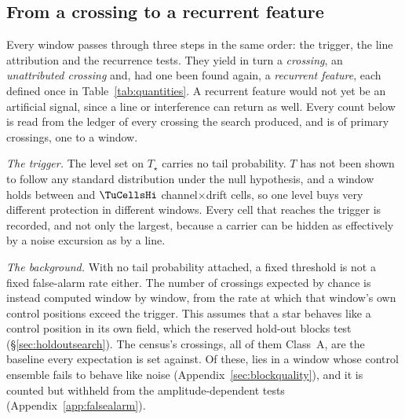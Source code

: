\subsection{From a crossing to a recurrent feature}
\label{sec:summary}

Every window passes through three steps in the same order: the trigger, the
line attribution and the recurrence tests. They yield in turn a
\emph{crossing}, an \emph{unattributed crossing} and, had one been found
again, a \emph{recurrent feature}, each defined once in
Table~\ref{tab:quantities}. A recurrent feature would not yet be an
artificial signal, since a line or interference can return as well.
Every count below is read from the ledger of every crossing the search
produced, and is of primary crossings, one to a window.

\emph{The trigger.} The level set on $T_\star$ carries no tail probability.
$T$ has not been shown to follow any standard distribution under the null
hypothesis, and a window holds between \TuCellsLo{} and $\TuCellsHi$
channel$\times$drift cells, so one level buys very different protection in
different windows. Every cell that reaches the trigger is recorded, and not
only the largest, because a carrier can be hidden as effectively by a noise
excursion as by a line.

\emph{The background.} With no tail probability attached, a fixed threshold
is not a fixed false-alarm rate either. The number of crossings expected by chance is instead computed window
by window, from the rate at which that window's own control positions exceed
the trigger. This assumes that a star behaves like a control position in its
own field, which the reserved hold-out blocks test (\S\ref{sec:holdoutsearch}).
The census's \CsNCrossQp{} crossings, all of them Class~A, are the baseline
every expectation is set against. Of these, \BkFlagNCrossOtherWord{} lies in a
window whose control ensemble fails to behave like noise
(Appendix~\ref{sec:blockquality}), and it is counted but withheld from the
amplitude-dependent tests (Appendix~\ref{app:falsealarm}).

